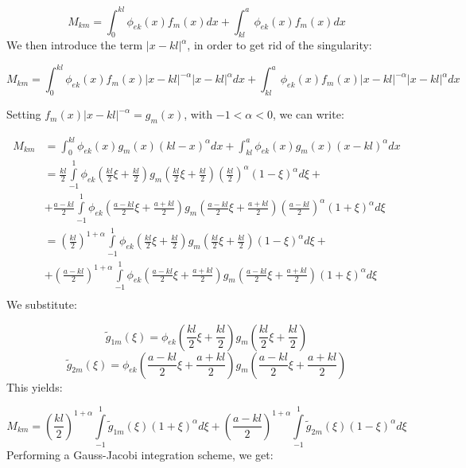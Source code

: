 \documentclass{article}
\begin{document}
\begin{equation*}
    M_{km} = \int_0^{kl} \phi_{ek} (x)f_m(x)dx + \int_{kl}^a \phi_{ek} (x)f_m(x)dx
\end{equation*}
We then introduce the term $|x - kl|^{\alpha}$, in order to get rid of the singularity:

\begin{equation*}
    M_{km} = \int_0^{kl} \phi_{ek} (x)f_m(x)|x - kl|^{-\alpha}|x - kl|^{\alpha}dx + \int_{kl}^a \phi_{ek} (x)f_m(x)|x - kl|^{-\alpha}|x - kl|^{\alpha}dx
\end{equation*}


Setting $f_m(x) |x-kl|^{-\alpha} = g_m(x)$, with $-1<\alpha<0$, we can write:

\begin{align*}
    M_{km} &= \int_0^{kl} \phi_{ek} (x)g_m(x)(kl-x)^{\alpha}dx + \int_{kl}^a \phi_{ek} (x)g_m(x)(x - kl)^{\alpha}dx\\
    &= \frac{kl}{2}\int\limits_{-1}^1 \phi_{ek}\left(\frac{kl}{2}\xi + \frac{kl}{2}\right)g_m\left(\frac{kl}{2}\xi + \frac{kl}{2}\right) \left(\frac{kl}{2}\right)^{\alpha}(1-\xi)^{\alpha}d\xi + \\
    &+ \frac{a-kl}{2} \int\limits_{-1}^1\phi_{ek}\left(\frac{a-kl}{2}\xi + \frac{a+kl}{2}\right)g_m\left(\frac{a-kl}{2}\xi + \frac{a+kl}{2}\right) \left(\frac{a-kl}{2}\right)^{\alpha}(1+\xi)^{\alpha}d\xi \\
    &= \left(\frac{kl}{2}\right)^{1+\alpha} \int\limits_{-1}^{1}\phi_{ek}\left(\frac{kl}{2}\xi + \frac{kl}{2}\right)g_m\left(\frac{kl}{2}\xi + \frac{kl}{2}\right)(1-\xi)^{\alpha}d\xi + \\
    &+ \left(\frac{a-kl}{2}\right)^{1 + \alpha} \int\limits_{-1}^1\phi_{ek}\left(\frac{a-kl}{2}\xi + \frac{a+kl}{2}\right)g_m\left(\frac{a-kl}{2}\xi + \frac{a+kl}{2}\right) (1+\xi)^{\alpha}d\xi \\
\end{align*}
We substitute:

\begin{equation}
    \tilde g_{1m}(\xi) = \phi_{ek}\left(\frac{kl}{2}\xi + \frac{kl}{2}\right)g_m\left(\frac{kl}{2}\xi + \frac{kl}{2}\right)
\end{equation}
\begin{equation}
    \tilde g_{2m}(\xi) = \phi_{ek}\left(\frac{a-kl}{2}\xi + \frac{a+kl}{2}\right)g_m\left(\frac{a-kl}{2}\xi + \frac{a+kl}{2}\right)
\end{equation}
This yields:

\begin{equation}
    M_{km} = \left(\frac{kl}{2}\right)^{1+\alpha} \int\limits_{-1}^{1} \tilde g_{1m}(\xi) (1+\xi)^{\alpha}d\xi + \left(\frac{a-kl}{2}\right)^{1 + \alpha}\int\limits_{-1}^{1} \tilde g_{2m}(\xi) (1-\xi)^{\alpha}d\xi
\end{equation}
Performing a Gauss-Jacobi integration scheme, we get:
\end{document}
